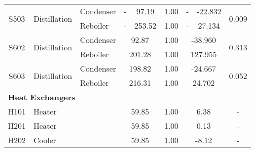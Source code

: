 \begin{table}[H]
\begin{tabular}{cllccccccc}
\multirow{2}{*}{S503} & \multirow{2}{*}{Distillation}      & Condenser     & -                     & 97.19                 & 1.00                    & -                    & -22.832              & \multicolumn{2}{c}{\multirow{2}{*}{0.009}} \\
                      &                                    & Reboiler      & -                     & 253.52                & 1.00                    & -                    & 27.134               & \multicolumn{2}{c}{}         \\
\multirow{2}{*}{S602} & \multirow{2}{*}{Distillation}      & Condenser     & \multicolumn{2}{c}{92.87}                     & 1.00                    & \multicolumn{2}{c}{-38.960}                 & \multicolumn{2}{c}{\multirow{2}{*}{0.313}} \\
                      &                                    & Reboiler      & \multicolumn{2}{c}{201.28}                    & 1.00                    & \multicolumn{2}{c}{127.955}                 & \multicolumn{2}{c}{}         \\
\multirow{2}{*}{S603} & \multirow{2}{*}{Distillation}      & Condenser     & \multicolumn{2}{c}{198.82}                    & 1.00                    & \multicolumn{2}{c}{-24.667}                 & \multicolumn{2}{c}{\multirow{2}{*}{0.052}} \\
                      &                                    & Reboiler      & \multicolumn{2}{c}{216.31}                    & 1.00                    & \multicolumn{2}{c}{24.702}                  & \multicolumn{2}{c}{}         \\ \cmidrule{1-10}
\multicolumn{10}{l}{\textbf{Heat Exchangers}}                                                                                                                                                                                                   \\
H101                  & \multicolumn{2}{l}{Heater}                         & \multicolumn{2}{c}{59.85}                     & 1.00                    & \multicolumn{2}{c}{6.38}                    & \multicolumn{2}{c}{-}                      \\
H201                  & \multicolumn{2}{l}{Heater}                         & \multicolumn{2}{c}{59.85}                     & 1.00                    & \multicolumn{2}{c}{0.13}                    & \multicolumn{2}{c}{-}                      \\
H202                  & \multicolumn{2}{l}{Cooler}                         & \multicolumn{2}{c}{59.85}                     & 1.00                    & \multicolumn{2}{c}{-8.12}                   & \multicolumn{2}{c}{-}                      \\

\end{tabular}
\end{table}
